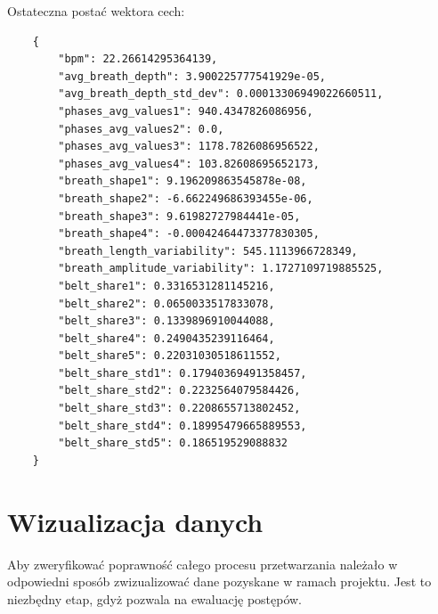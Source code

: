 Ostateczna postać wektora cech:\\
\begin{verbatim}
    {
        "bpm": 22.26614295364139, 
        "avg_breath_depth": 3.900225777541929e-05, 
        "avg_breath_depth_std_dev": 0.00013306949022660511, 
        "phases_avg_values1": 940.4347826086956, 
        "phases_avg_values2": 0.0, 
        "phases_avg_values3": 1178.7826086956522, 
        "phases_avg_values4": 103.82608695652173, 
        "breath_shape1": 9.196209863545878e-08, 
        "breath_shape2": -6.662249686393455e-06, 
        "breath_shape3": 9.61982727984441e-05, 
        "breath_shape4": -0.00042464473377830305, 
        "breath_length_variability": 545.1113966728349, 
        "breath_amplitude_variability": 1.1727109719885525, 
        "belt_share1": 0.3316531281145216, 
        "belt_share2": 0.0650033517833078, 
        "belt_share3": 0.1339896910044088, 
        "belt_share4": 0.2490435239116464, 
        "belt_share5": 0.22031030518611552, 
        "belt_share_std1": 0.17940369491358457, 
        "belt_share_std2": 0.2232564079584426, 
        "belt_share_std3": 0.2208655713802452, 
        "belt_share_std4": 0.18995479665889553, 
        "belt_share_std5": 0.186519529088832
    }
\end{verbatim}

\section{Wizualizacja danych}
Aby zweryfikować poprawność całego procesu przetwarzania 
należało w odpowiedni sposób zwizualizować dane pozyskane w ramach 
projektu. Jest to niezbędny etap, gdyż pozwala na ewaluację  
postępów.
\medbreak


